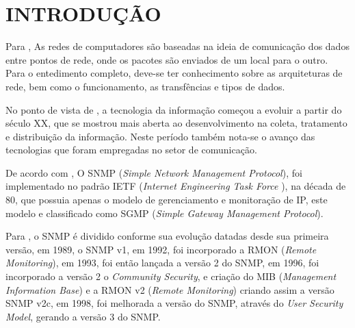 \chapter{INTRODUÇÃO}


\par Para , As redes de computadores são baseadas
na ideia de comunicação dos dados entre pontos de rede, onde os pacotes são
enviados de um local para o outro. Para o entedimento completo, deve-se ter
conhecimento sobre as arquiteturas de rede, bem como o funcionamento, as
transfências e tipos de dados.

\par No ponto de vista de , a tecnologia da
informação começou a evoluir a partir do século XX, que se mostrou mais 
aberta ao desenvolvimento na coleta, tratamento e distribuição da 
informação. Neste período também nota-se o avanço das tecnologias 
que foram empregadas no setor de comunicação.

\par De acordo com , O SNMP (\textit{Simple
Network Management Protocol}), foi implementado no padrão IETF 
(\textit{Internet Engineering Task Force }), na década de 80, que possuia apenas
o modelo de gerenciamento e monitoração de IP, este modelo e classificado como
SGMP (\textit{Simple Gateway Management Protocol}). 

\par Para , o  SNMP é dividido conforme sua evolução
datadas desde sua primeira versão, em 1989, o SNMP v1, em 1992, foi incorporado
a RMON (\textit{Remote Monitoring}), em 1993, foi então lançada a versão 2 do
SNMP, em 1996, foi incorporado a versão 2 o \textit{Community Security}, e
criação do MIB (\textit{Management Information Base}) e a RMON v2 
(\textit{Remote Monitoring}) criando assim a versão SNMP v2c, em 1998, foi melhorada a versão do
SNMP, através do \textit{User Security Model}, gerando a versão 3 do SNMP.

